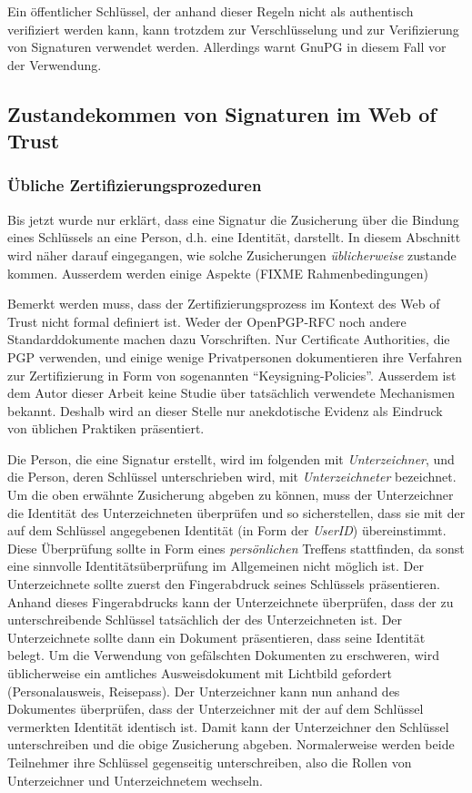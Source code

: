 Ein öffentlicher Schlüssel, der anhand dieser Regeln nicht als
authentisch verifiziert werden kann, kann trotzdem zur Verschlüsselung
und zur Verifizierung von Signaturen verwendet werden. Allerdings
warnt GnuPG in diesem Fall vor der Verwendung.

\subsection{Zustandekommen von Signaturen im Web of Trust}
\label{sec:sozi-komp-des}

\subsubsection{\"Ubliche Zertifizierungsprozeduren}
\label{sec:ubliche-zert}

Bis jetzt wurde nur erkl\"art, dass eine Signatur die
Zusicherung \"uber die Bindung eines Schl\"ussels an eine Person,
d.h. eine Identit\"at, darstellt. In diesem Abschnitt wird n\"aher
darauf eingegangen, wie solche Zusicherungen \emph{\"ublicherweise}
zustande kommen. Ausserdem werden einige Aspekte (FIXME
Rahmenbedingungen)

Bemerkt werden muss, dass der Zertifizierungsprozess im Kontext des
Web of Trust nicht formal definiert ist. Weder der OpenPGP-RFC noch
andere Standarddokumente machen dazu Vorschriften. Nur Certificate
Authorities, die PGP verwenden, und einige wenige Privatpersonen
dokumentieren ihre Verfahren zur Zertifizierung in Form von
sogenannten ``Keysigning-Policies''. Ausserdem ist dem Autor dieser
Arbeit keine Studie \"uber tats\"achlich verwendete Mechanismen
bekannt. Deshalb wird an dieser Stelle nur anekdotische Evidenz
als Eindruck von \"ublichen Praktiken pr\"asentiert.

Die Person, die eine Signatur erstellt, wird im folgenden mit
\emph{Unterzeichner}, und die Person, deren Schl\"ussel
unterschrieben wird, mit \emph{Unterzeichneter} bezeichnet. Um
die oben erw\"ahnte Zusicherung abgeben zu k\"onnen, muss der
Unterzeichner die Identit\"at des Unterzeichneten \"uberpr\"ufen und
so sicherstellen, dass sie mit der auf dem Schl\"ussel angegebenen
Identit\"at (in Form der \emph{UserID}) \"ubereinstimmt. Diese
\"Uberpr\"ufung sollte in Form eines \emph{pers\"onlichen} Treffens
stattfinden, da sonst eine sinnvolle Identit\"ats\"uberpr\"ufung im
Allgemeinen nicht m\"oglich ist. Der Unterzeichnete sollte zuerst den
Fingerabdruck seines Schl\"ussels pr\"asentieren. Anhand dieses
Fingerabdrucks kann der Unterzeichnete \"uberpr\"ufen, dass der zu
unterschreibende Schl\"ussel tats\"achlich der des Unterzeichneten
ist.  Der Unterzeichnete sollte dann ein Dokument pr\"asentieren, dass
seine Identit\"at belegt. Um die Verwendung von gef\"alschten
Dokumenten zu erschweren, wird \"ublicherweise ein amtliches
Ausweisdokument mit Lichtbild gefordert (Personalausweis,
Reisepass). Der Unterzeichner kann nun anhand des Dokumentes
\"uberpr\"ufen, dass der Unterzeichner mit der auf dem Schl\"ussel
vermerkten Identit\"at identisch ist. Damit kann der Unterzeichner den
Schl\"ussel unterschreiben und die obige Zusicherung
abgeben. Normalerweise werden beide Teilnehmer ihre Schl\"ussel
gegenseitig unterschreiben, also die Rollen von Unterzeichner und
Unterzeichnetem wechseln.

